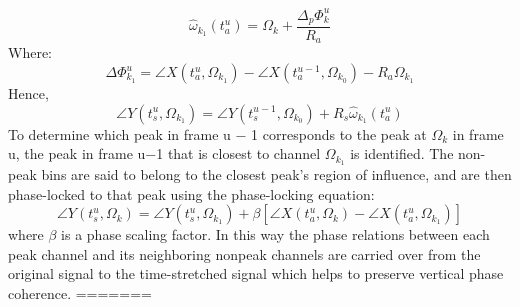 \documentclass[]{article}
\begin{document}
\begin{equation}
\hat{\omega}_{k_1} (t_{a}^{u})= \Omega_{k} + \frac {\Delta_{p} \Phi_{k}^{u}} {R_{a}}
\end{equation}
\centering
Where:
\begin{equation}
\Delta\Phi_{k_1}^{u} = \angle X(t_{a}^{u}, \Omega_{k_1}) - \angle X(t_{a}^{u-1}, \Omega_{k_0}) - R_{a}\Omega_{k_1}
\end{equation}
\centering
Hence,
\begin{equation}
\angle Y(t_{s}^{u}, \Omega_{k_1}) = \angle Y(t_{s}^{u-1}, \Omega_{k_0}) + R_{s}\hat{\omega}_{k_1}(t_{a}^{u})
\end{equation}
\centering 
To determine which peak in frame u − 1 corresponds to the
peak at $\Omega_k$ in frame u, the peak in frame u−1 that is closest
to channel $\Omega_k_1$ is identified. The non-peak bins are said to
belong to the closest peak’s region of influence, and are then
phase-locked to that peak using the phase-locking equation:
\begin{equation}
\angle Y(t_{s}^{u}, \Omega_{k}) = \angle Y(t_{s}^{u}, \Omega_{k_1}) + \beta [ \angle X(t_{a}^{u}, \Omega_{k}) - \angle X(t_{a}^{u}, \Omega_{k_1}) ]
\end{equation}
where $\beta$ is a phase scaling factor. In this way the phase relations
between each peak channel and its neighboring nonpeak
channels are carried over from the original signal to the
time-stretched signal which helps to preserve vertical phase
coherence.
=======
\end{document}
